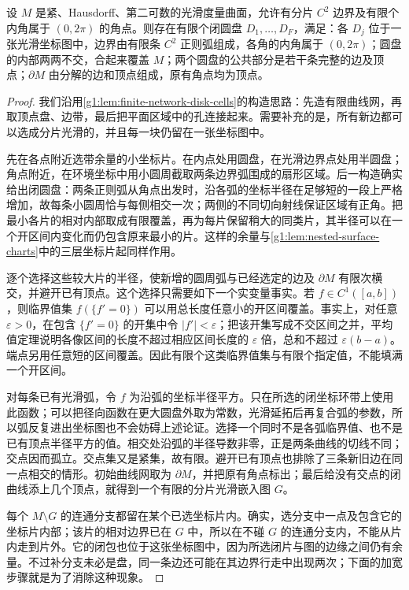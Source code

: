 \begin{lemma}\label{g1:lem:smooth-coordinate-disk-decomposition}
	设 \(M\) 是紧、Hausdorff、第二可数的光滑度量曲面，允许有分片 \(C^2\) 边界及有限个内角属于 \((0,2\pi)\) 的角点。则存在有限个闭圆盘 \(D_1,\ldots,D_F\)，满足：各 \(D_j\) 位于一张光滑坐标图中，边界由有限条 \(C^2\) 正则弧组成，各角的内角属于 \((0,2\pi)\)；圆盘的内部两两不交，合起来覆盖 \(M\)；两个圆盘的公共部分是若干条完整的边及顶点；\(\partial M\) 由分解的边和顶点组成，原有角点均为顶点。
\end{lemma}
\begin{proof}
	我们沿用\cref{g1:lem:finite-network-disk-cells}的构造思路：先造有限曲线网，再取顶点盘、边带，最后把平面区域中的孔连接起来。需要补充的是，所有新边都可以选成分片光滑的，并且每一块仍留在一张坐标图中。

	先在各点附近选带余量的小坐标片。在内点处用圆盘，在光滑边界点处用半圆盘；角点附近，在环境坐标中用小圆周截取两条边界弧围成的扇形区域。后一构造确实给出闭圆盘：两条正则弧从角点出发时，沿各弧的坐标半径在足够短的一段上严格增加，故每条小圆周恰与每侧相交一次；两侧的不同切向射线保证区域有正角。把最小各片的相对内部取成有限覆盖，再为每片保留稍大的同类片，其半径可以在一个开区间内变化而仍包含原来最小的片。这样的余量与\cref{g1:lem:nested-surface-charts}中的三层坐标片起同样作用。

	逐个选择这些较大片的半径，使新增的圆周弧与已经选定的边及 \(\partial M\) 有限次横交，并避开已有顶点。这个选择只需要如下一个实变量事实。若 \(f\in C^1([a,b])\)，则临界值集 \(f(\{f'=0\})\) 可以用总长度任意小的开区间覆盖。事实上，对任意 \(\varepsilon>0\)，在包含 \(\{f'=0\}\) 的开集中令 \(|f'|<\varepsilon\)；把该开集写成不交区间之并，平均值定理说明各像区间的长度不超过相应区间长度的 \(\varepsilon\) 倍，总和不超过 \(\varepsilon(b-a)\)。端点另用任意短的区间覆盖。因此有限个这类临界值集与有限个指定值，不能填满一个开区间。

	对每条已有光滑弧，令 \(f\) 为沿弧的坐标半径平方。只在所选的闭坐标环带上使用此函数；可以把径向函数在更大圆盘外取为常数，光滑延拓后再复合弧的参数，所以弧反复进出坐标图也不会妨碍上述论证。选择一个同时不是各弧临界值、也不是已有顶点半径平方的值。相交处沿弧的半径导数非零，正是两条曲线的切线不同；交点因而孤立。交点集又是紧集，故有限。避开已有顶点也排除了三条新旧边在同一点相交的情形。初始曲线网取为 \(\partial M\)，并把原有角点标出；最后给没有交点的闭曲线添上几个顶点，就得到一个有限的分片光滑嵌入图 \(G\)。

	每个 \(M\setminus G\) 的连通分支都留在某个已选坐标片内。确实，选分支中一点及包含它的坐标片内部；该片的相对边界已在 \(G\) 中，所以在不碰 \(G\) 的连通分支内，不能从片内走到片外。它的闭包也位于这张坐标图中，因为所选闭片与图的边缘之间仍有余量。不过补分支未必是盘，同一条边还可能在其边界行走中出现两次；下面的加宽步骤就是为了消除这种现象。


\end{proof}
